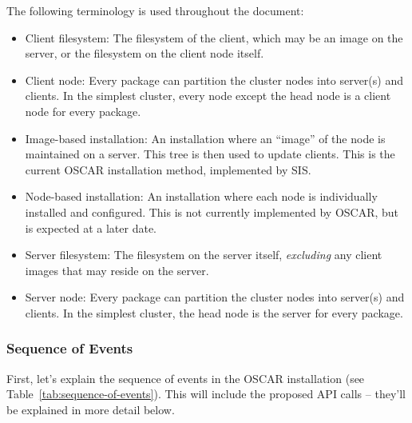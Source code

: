 The following terminology is used throughout the document:

\begin{itemize}
\item Client filesystem: The filesystem of the client, which may be an
  image on the server, or the filesystem on the client node itself.
  
\item Client node: Every package can partition the cluster nodes into
  server(s) and clients.  In the simplest cluster, every node except
  the head node is a client node for every package.
  
\item Image-based installation: An installation where an ``image'' of
  the node is maintained on a server.  This tree is then used to
  update clients.  This is the current OSCAR installation method,
  implemented by SIS.
  
\item Node-based installation: An installation where each node is
  individually installed and configured.  This is not currently
  implemented by OSCAR, but is expected at a later date.
  
\item Server filesystem: The filesystem on the server itself, {\em
    excluding} any client images that may reside on the server.
  
\item Server node: Every package can partition the cluster nodes into
  server(s) and clients.  In the simplest cluster, the head node is the
  server for every package.
\end{itemize}


\subsubsection{Sequence of Events}

First, let's explain the sequence of events in the OSCAR installation
(see Table~\ref{tab:sequence-of-events}).  This will include the
proposed API calls -- they'll be explained in more detail below.

\begchange

